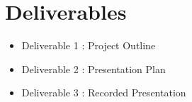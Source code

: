 \documentclass[12pt]{article}
\begin{document}
\section*{Deliverables}
\begin{itemize}
    \item Deliverable 1 : Project Outline 
    \item Deliverable 2 : Presentation Plan
    \item Deliverable 3 : Recorded Presentation 
\end{itemize}
\end{document}
